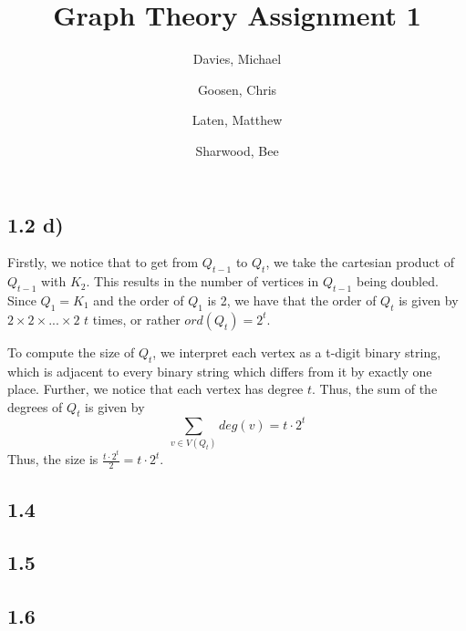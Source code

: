 \documentclass[a4paper]{article}
\begin{document}
\title{Graph Theory Assignment 1}
\author {
    Davies, Michael\\
    \and
    Goosen, Chris\\
    \and
    Laten, Matthew\\
    \and
    Sharwood, Bee\\
    \and
}
\maketitle

\subsection*{1.2 d)}
Firstly, we notice that to get from $Q_{t-1}$ to $Q_t$, we take the cartesian
product of $Q_{t-1}$ with $K_2$. This results in the number of vertices in
$Q_{t-1}$ being doubled. Since $Q_1 = K_1$ and the order of $Q_1$ is 2, we have
that the order of $Q_t$ is given by $2 \times 2 \times ... \times 2$ $t$ times,
or rather $ord(Q_t) = 2^t$.

To compute the size of $Q_t$, we interpret each vertex as a t-digit binary
string, which is adjacent to every binary string which differs from it by
exactly one place. Further, we notice that each vertex has degree $t$. Thus,
the sum of the degrees of $Q_t$ is given by
\begin{equation}
    \sum_{v \in V(Q_t)} deg(v) = t\cdot2^t
\end{equation}
Thus, the size is $\frac{t\cdot2^t}{2} = t\cdot2^t$.

\subsection*{1.4}

\subsection*{1.5}

\subsection*{1.6}

\end{document}
